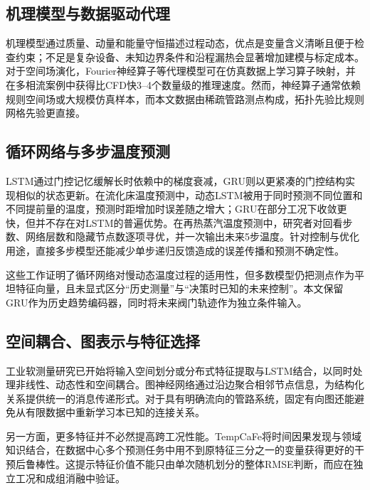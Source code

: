 \documentclass[a4paper,fleqn]{cas-dc}
\begin{document}
\subsection{机理模型与数据驱动代理}

机理模型通过质量、动量和能量守恒描述过程动态，优点是变量含义清晰且便于检查约束；不足是复杂设备、未知边界条件和沿程漏热会显著增加建模与标定成本。对于空间场演化，Fourier神经算子等代理模型可在仿真数据上学习算子映射，并在多相流案例中获得比CFD快3--4个数量级的推理速度\citep{guida2026fno}。然而，神经算子通常依赖规则空间场或大规模仿真样本，而本文数据由稀疏管路测点构成，拓扑先验比规则网格先验更直接。

\subsection{循环网络与多步温度预测}

LSTM通过门控记忆缓解长时依赖中的梯度衰减\citep{hochreiter1997lstm}，GRU则以更紧凑的门控结构实现相似的状态更新\citep{cho2014gru}。在流化床温度预测中，动态LSTM被用于同时预测不同位置和不同提前量的温度，预测时距增加时误差随之增大；GRU在部分工况下收敛更快，但并不存在对LSTM的普遍优势\citep{faridi2023spatiotemporal}。在再热蒸汽温度预测中，研究者对回看步数、网络层数和隐藏节点数逐项寻优，并一次输出未来5步温度\citep{tan2022multistep}。针对控制与优化用途，直接多步模型还能减少单步递归反馈造成的误差传播和预测不确定性\citep{costa2024multistep}。

这些工作证明了循环网络对慢动态温度过程的适用性，但多数模型仍把测点作为平坦特征向量，且未显式区分“历史测量”与“决策时已知的未来控制”。本文保留GRU作为历史趋势编码器，同时将未来阀门轨迹作为独立条件输入。

\subsection{空间耦合、图表示与特征选择}

工业软测量研究已开始将输入空间划分或分布式特征提取与LSTM结合，以同时处理非线性、动态性和空间耦合\citep{he2025nisrdelm}。图神经网络通过沿边聚合相邻节点信息，为结构化关系提供统一的消息传递形式\citep{gilmer2017mpnn}。对于具有明确流向的管路系统，固定有向图还能避免从有限数据中重新学习本已知的连接关系。

另一方面，更多特征并不必然提高跨工况性能。TempCaFe将时间因果发现与领域知识结合，在数据中心多个预测任务中用不到原特征三分之一的变量获得更好的干预后鲁棒性\citep{zapata2026tempcafe}。这提示特征价值不能只由单次随机划分的整体RMSE判断，而应在独立工况和成组消融中验证。
\end{document}
